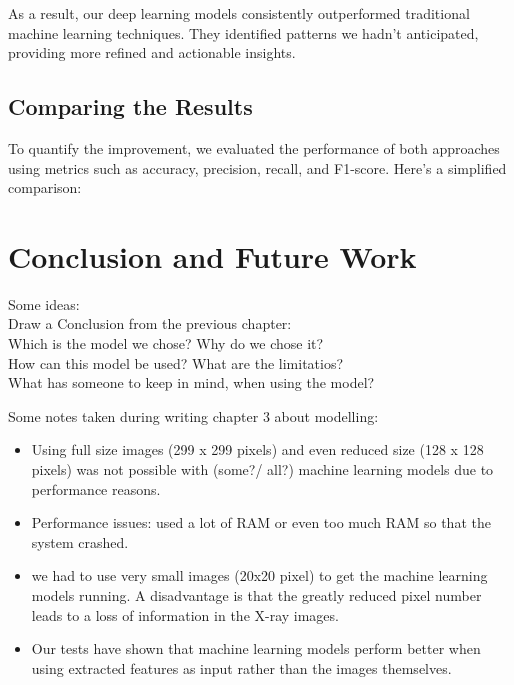 \documentclass{article}
\begin{document}
As a result, our deep learning models consistently outperformed traditional machine learning techniques. They identified patterns we hadn't anticipated, providing more refined and actionable insights.

\subsection{Comparing the Results}
To quantify the improvement, we evaluated the performance of both approaches using metrics such as accuracy, precision, recall, and F1-score. Here’s a simplified comparison:


\section{Conclusion and Future Work}

Some ideas:\\
Draw a Conclusion from the previous chapter: \\
Which is the model we chose? Why do we chose it? \\
How can this model be used? What are the limitatios? \\
What has someone to keep in mind, when using the model? 

Some notes taken during writing chapter 3 about modelling: 
\begin{itemize}
    \item Using full size images (299 x 299 pixels) and even reduced size (128 x 128 pixels) was not possible with (some?/ all?) machine learning models due to performance reasons. 
    \item Performance issues: used a lot of RAM or even too  much RAM so that the system crashed. 
    \item we had to use very small images (20x20 pixel) to get the machine learning models running. A disadvantage is that the greatly reduced pixel number leads to a loss of information in the X-ray images.
    \item Our tests have shown that machine learning models perform better when using extracted features as input rather than the images themselves. 
\end{itemize}


\end{document}
